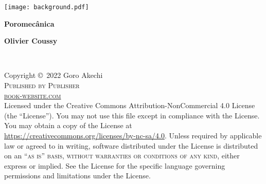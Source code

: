 \documentclass[
	11pt, %
	fleqn, %
	a4paper, %
]{LegrandOrangeBook}
\begin{document}

\titlepage %
	{\texttt{[image: background.pdf]}} %
	{ %
		\centering\sffamily %
		{\Huge\bfseries Poromecânica\par} %
		\vspace{16pt} %
		{\LARGE \par} %
		\vspace{24pt} %
		{\huge\bfseries Olivier Coussy\par} %
	}


\thispagestyle{empty} %

~\vfill %

\noindent Copyright \copyright\ 2022 Goro Akechi\\ %

\noindent \textsc{Published by Publisher}\\ %

\noindent \textsc{\href{https://www.latextemplates.com/template/legrand-orange-book}{book-website.com}}\\ %

\noindent Licensed under the Creative Commons Attribution-NonCommercial 4.0 License (the ``License''). You may not use this file except in compliance with the License. You may obtain a copy of the License at \url{https://creativecommons.org/licenses/by-nc-sa/4.0}. Unless required by applicable law or agreed to in writing, software distributed under the License is distributed on an \textsc{``as is'' basis, without warranties or conditions of any kind}, either express or implied. See the License for the specific language governing permissions and limitations under the License.\\ %
\end{document}
